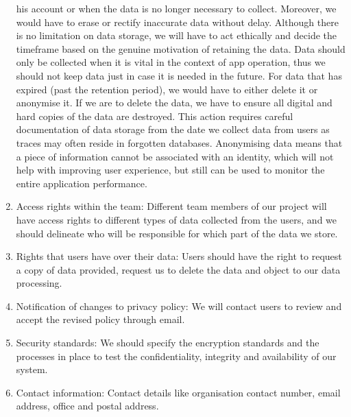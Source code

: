 \begin{enumerate}
    his account or when the data is no longer necessary to collect. Moreover, we would have to erase or rectify inaccurate data without delay. Although 
    there is no limitation on data storage, we will have to act ethically and
    decide the timeframe based on the genuine motivation of retaining the data. Data should only be collected when it is vital in the context
    of app operation, thus we should not keep data just in case it is needed in the future. For data that has expired (past the retention period), we 
    would have to either delete it or anonymise it. If we are to delete the data, we have to ensure all digital and hard copies of the data are destroyed. 
    This action requires careful documentation of data storage from the date we collect data from users as traces may often reside in forgotten databases.
    Anonymising data means that a piece of information cannot be associated with an identity, which will not help with improving user experience, but still 
    can be used to monitor the entire application performance.
    \item Access rights within the team: Different team members of our project will have access rights to different types of data collected from
    the users, and we should delineate who will be responsible for which part of the data we store.
    \item Rights that users have over their data: Users should have the right to request a copy of data provided, request us to delete the data and object to our data processing.
    \item Notification of changes to privacy policy: We will contact users to review and accept the revised policy through email.
    \item Security standards: We should specify the encryption standards and the processes in place to test the confidentiality, integrity and availability of 
    our system.
    \item Contact information: Contact details like organisation contact number, email address, office and postal address.
\end{enumerate}

